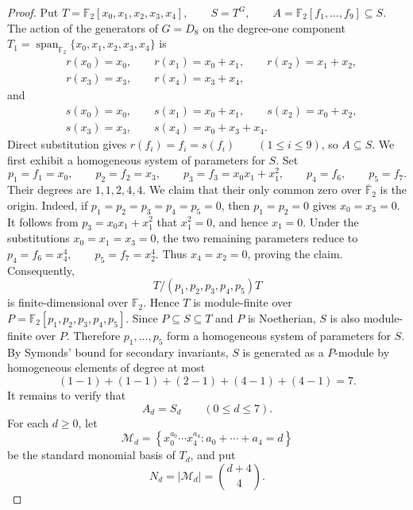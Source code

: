 \documentclass[11pt]{article}
\theoremstyle{definition}
\newcommand{\Span}{\operatorname{span}}
\begin{document}
	\begin{proof}
	
Put $T=\mathbb F_{2}[x_{0},x_{1},x_{2},x_{3},x_{4}], \qquad S=T^{G}, \qquad A=\mathbb F_{2}[f_{1},\ldots,f_{9}]\subseteq S$. The action of the generators of \(G=D_{8}\) on the degree-one component \(T_{1}=\Span_{\mathbb F_2}\{x_0,x_1,x_2,x_3,x_4\}\) is
			\[
			\begin{aligned}
				&r(x_{0})=x_{0},\qquad
				r(x_{1})=x_{0}+x_{1},\qquad
				r(x_{2})=x_{1}+x_{2},\\
				&r(x_{3})=x_{3},\qquad
				r(x_{4})=x_{3}+x_{4},
			\end{aligned}
			\]
			and
			\[
			\begin{aligned}
				&s(x_{0})=x_{0},\qquad
				s(x_{1})=x_{0}+x_{1},\qquad
				s(x_{2})=x_{0}+x_{2},\\
				&s(x_{3})=x_{3},\qquad
				s(x_{4})=x_{0}+x_{3}+x_{4}.
			\end{aligned}
			\]
Direct substitution gives $r(f_i)=f_i=s(f_i) \qquad (1\leq i\leq 9)$, so \(A\subseteq S\). We first exhibit a homogeneous system of parameters for \(S\). Set
			\[
			p_{1}=f_{1}=x_{0},\qquad
			p_{2}=f_{2}=x_{3},\qquad
			p_{3}=f_{3}=x_{0}x_{1}+x_{1}^{2},
			\qquad
			p_{4}=f_{6},\qquad
			p_{5}=f_{7}.
			\]
			Their degrees are $1,1,2,4,4$. We claim that their only common zero over \(\overline{\mathbb F}_{2}\) is the origin. Indeed, if $p_{1}=p_{2}=p_{3}=p_{4}=p_{5}=0$, then \(p_{1}=p_{2}=0\) gives $x_{0}=x_{3}=0$. It follows from $p_{3}=x_{0}x_{1}+x_{1}^{2}$ that $x_{1}^{2}=0$, and hence \(x_{1}=0\). Under the substitutions
			\(x_{0}=x_{1}=x_{3}=0\), the two remaining parameters reduce to $p_{4}=f_{6}=x_{4}^{4}, \qquad p_{5}=f_{7}=x_{2}^{4}$. Thus \(x_{4}=x_{2}=0\), proving the claim. Consequently,
			\[
			T/(p_{1},p_{2},p_{3},p_{4},p_{5})T
			\]
			is finite-dimensional over \(\mathbb F_{2}\). Hence \(T\) is module-finite over $P=\mathbb F_{2}[p_{1},p_{2},p_{3},p_{4},p_{5}]$. Since \(P\subseteq S\subseteq T\) and \(P\) is Noetherian, \(S\) is also
			module-finite over \(P\). Therefore \(p_{1},\ldots,p_{5}\) form a homogeneous system of parameters for \(S\). By Symonds' bound for secondary invariants, \(S\) is generated as a
			\(P\)-module by homogeneous elements of degree at most
			\[
			(1-1)+(1-1)+(2-1)+(4-1)+(4-1)=7.
			\]
			It remains to verify that
			\[
			A_d=S_d\qquad(0\leq d\leq7).
			\]
			For each \(d\geq0\), let
			\[
			\mathcal M_d=
			\left\{x_0^{a_0}\cdots x_4^{a_4}:a_0+\cdots+a_4=d\right\}
			\]
			be the standard monomial basis of \(T_d\), and put
			\[
			N_d=|\mathcal M_d|=\binom{d+4}{4}.
\]
\end{proof}
\end{document}
